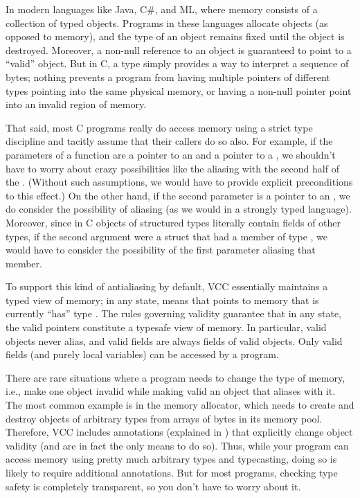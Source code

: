In modern languages like Java, C\#, and ML, where memory consists of a
collection of typed objects. Programs in these languages allocate
objects (as opposed to memory), and the type of an object remains
fixed until the object is destroyed. Moreover, a non-null reference to
an object is guaranteed to point to a ``valid'' object. But in C, a
type simply provides a way to interpret a sequence of bytes; nothing
prevents a program from having multiple pointers of different types
pointing into the same physical memory, or having a non-null
pointer point into an invalid region of memory.

That said, most C programs really do access memory using a strict type
discipline and tacitly assume that their callers do
so also. For example, if the parameters of a function are a pointer to
an  and a pointer to a , we shouldn't have to worry
about crazy possibilities like the  aliasing with the second
half of the . (Without such assumptions, we would have to
provide explicit preconditions to this effect.)  On the other hand, if
the second parameter is a pointer to an , we do consider the
possibility of aliasing (as we would in a strongly typed language).
Moreover, since in C objects of structured types literally contain
fields of other types, if the second argument were a struct that had
a member of type , we would have to consider the possibility
of the first parameter aliasing that member. 

To support this kind of antialiasing by default, VCC essentially
maintains a typed view of memory; in any state,  means
that  points to memory that is currently ``has'' type
. The rules governing validity guarantee that in any state, the
valid pointers constitute a typesafe view of memory.  In particular,
valid objects never alias, and valid fields are always fields of valid
objects. Only valid fields (and purely local variables) can be
accessed by a program.

There are rare situations where a program needs to change the type of
memory, i.e., make one object invalid while making valid an object
that aliases with it. The most common example is in the memory
allocator, which needs to create and destroy objects of arbitrary
types from arrays of bytes in its memory pool. Therefore, VCC includes
annotations (explained in ) that explicitly change
object validity (and are in fact the only means to do so).  Thus,
while your program can access memory using pretty much arbitrary types
and typecasting, doing so is likely to require additional
annotations. But for most programs, checking type safety is completely
transparent, so you don't have to worry about it.

